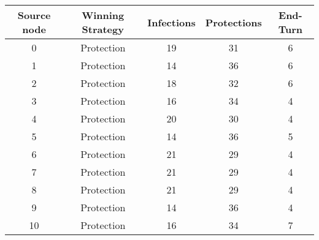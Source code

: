 \documentclass[results.tex]{subfiles}
\begin{document}
    \begin{center}
        \begin{tabular}{| c || c | c | c | c |}
            \hline
            {\bfseries Source node} & {\bfseries Winning Strategy} & {\bfseries Infections} & {\bfseries Protections}
            & {\bfseries End-Turn}
            \\  %
            \hline\hline
            0                       & Protection                   & 19                     & 31                      & 6                    \\
            \hline
            1                       & Protection                   & 14                     & 36                      & 6                    \\
            \hline
            2                       & Protection                   & 18                     & 32                      & 6                    \\
            \hline
            3                       & Protection                   & 16                     & 34                      & 4                    \\
            \hline
            4                       & Protection                   & 20                     & 30                      & 4                    \\
            \hline
            5                       & Protection                   & 14                     & 36                      & 5                    \\
            \hline
            6                       & Protection                   & 21                     & 29                      & 4                    \\
            \hline
            7                       & Protection                   & 21                     & 29                      & 4                    \\
            \hline
            8                       & Protection                   & 21                     & 29                      & 4                    \\
            \hline
            9                       & Protection                   & 14                     & 36                      & 4                    \\
            \hline
            10                      & Protection                   & 16                     & 34                      & 7                    \\

\end{tabular}
\end{center}
\end{document}
